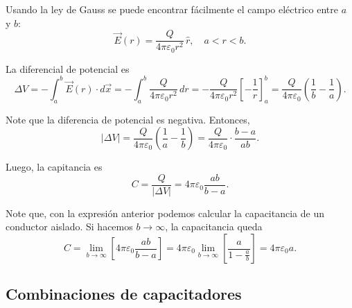 Usando la ley de Gauss se puede encontrar fácilmente el campo eléctrico entre $a$ y $b$:
$$\Vec{E}(r) = \frac{Q}{4\pi \varepsilon_0 r^2} \,\hat{r}, \quad a < r < b.$$

La diferencial de potencial es
$$\Delta V = - \int_a^b \Vec{E}(r) \cdot d\Vec{x} = - \int_a^b \frac{Q}{4\pi \varepsilon_0 r^2} \,dr = - \frac{Q}{4\pi \varepsilon_0 r^2} \left[ - \frac{1}{r}  \right]_a^b = \frac{Q}{4\pi \varepsilon_0} \left( \frac{1}{b} - \frac{1}{a} \right).$$

Note que la diferencia de potencial es negativa. Entonces,
$$|\Delta V| = \frac{Q}{4\pi \varepsilon_0} \left( \frac{1}{a} - \frac{1}{b} \right) = \frac{Q}{4\pi \varepsilon_0} \cdot \frac{b-a}{ab}.$$

Luego, la capitancia es
$$C = \frac{Q}{|\Delta V|} = 4\pi \varepsilon_0 \frac{ab}{b-a}.$$

Note que, con la expresión anterior podemos calcular la capacitancia de un conductor aislado. Si hacemos $b \to  \infty$, la capacitancia queda
\begin{equation*}
C = \lim_{b \to \infty} \left[ 4\pi \varepsilon_0 \frac{ab}{b-a} \right] = 4\pi \varepsilon_0 \lim_{b \to \infty} \left[\frac{a}{1 - \frac{a}{b}} \right] = 4\pi \varepsilon_0 a.
\end{equation*}

\subsection*{Combinaciones de capacitadores}

